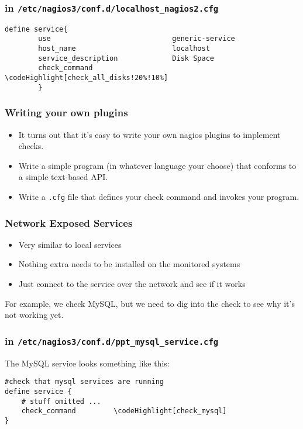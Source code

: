 \documentclass[10pt]{beamer}
\newcommand\codeHighlight[1]{\textcolor[rgb]{1,0,0}{\textbf{#1}}}
\begin{document}
\begin{frame}[fragile]
  \frametitle{in \texttt{/etc/nagios3/conf.d/localhost\_nagios2.cfg}}


\begin{Verbatim}[commandchars=\\\[\]]
define service{
        use                             generic-service
        host_name                       localhost
        service_description             Disk Space
        check_command                   \codeHighlight[check_all_disks!20%!10%]
        }
\end{Verbatim}


\end{frame}

\begin{frame}
  \frametitle{Writing your own plugins}


\begin{itemize}
  \item It turns out that it's easy to write your own nagios plugins to 
	  implement checks.
  \item Write a simple program (in whatever language your choose) that 
	  conforms to a simple text-based API.
  \item Write a \texttt{.cfg} file that defines your check command and invokes
		  your program.
\end{itemize}


\end{frame}
\begin{frame}
  \frametitle{Network Exposed Services}


\begin{itemize}
  \item Very similar to local services
  \item Nothing extra needs to be installed on the monitored systems
  \item Just connect to the service over the network and see if it works
\end{itemize}

For example, we check MySQL, but we need to dig into the check to see why
it's not working yet.

\end{frame}

\begin{frame}[fragile]
  \frametitle{in \texttt{/etc/nagios3/conf.d/ppt\_mysql\_service.cfg}}

The MySQL service looks something like this:
\begin{Verbatim}[commandchars=\\\[\]]
#check that mysql services are running
define service {
    # stuff omitted ...
    check_command         \codeHighlight[check_mysql]
}

\end{Verbatim}
\end{frame}
\end{document}
